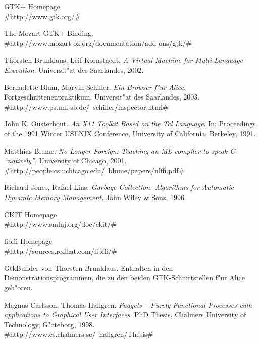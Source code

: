 \documentclass[a4paper,titlepage]{article}
\begin{document}
\begin{thebibliography}{99}
  GTK+ Homepage\\
                     #http://www.gtk.org/#

  The Mozart GTK+ Binding.\\
                     #http://www.mozart-oz.org/documentation/add-ons/gtk/#
                   
  Thorsten Brunklaus, Leif Kornstaedt.
                \emph{A Virtual Machine for Multi-Language Execution}.
                Universit"at des Saarlandes, 2002.
                 
  Bernadette Blum, Marvin Schiller.
                     \emph{Ein Browser f"ur Alice}. Fortgeschrittenenpraktikum,
                     Universit"at des Saarlandes, 2003.\\
                     #http://www.ps.uni-sb.de/~schiller/inspector.html#

  John K. Ousterhout. \emph{An X11 Toolkit Based on the
                 Tcl Language}. In: Proceedings of the 1991 Winter USENIX
                 Conference, University of California, Berkeley, 1991.

  Matthias Blume. \emph{No-Longer-Foreign: Teaching an
                 ML compiler to speak C ``natively''}.
                 University of Chicago, 2001.\\
                 #http://people.cs.uchicago.edu/~blume/papers/nlffi.pdf#

  Richard Jones, Rafael Lins. \emph{Garbage Collection.
                 Algorithms for Automatic Dynamic Memory Management.}
                 John Wiley \& Sons, 1996.

  CKIT Homepage\\
                #http://www.smlnj.org/doc/ckit/#

  libffi Homepage\\
                  #http://sources.redhat.com/libffi/#

  GtkBuilder von Thorsten Brunklaus. Enthalten in den
                      Demonstrationsprogrammen, die zu den beiden
                      GTK-Schnittstellen f"ur Alice geh"oren.
                 
  Magnus Carlsson, Thomas Hallgren.
                   \emph{Fudgets -- Purely Functional Processes with
                   applications to Graphical User Interfaces}.
                   PhD Thesis, Chalmers University of Technology, G"oteborg,
                   1998.\\
                   #http://www.cs.chalmers.se/~hallgren/Thesis#
\end{thebibliography}
\end{document}
